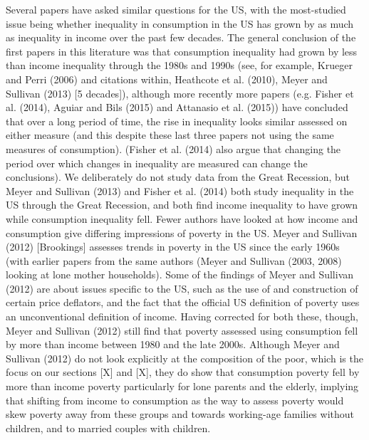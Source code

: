 Several papers have asked similar questions for the US, with the most-studied issue being whether inequality in consumption in the US has grown by as much as inequality in income over the past few decades. The general conclusion of the first papers in this literature was that consumption inequality had grown by less than income inequality through the 1980s and 1990s (see, for example, Krueger and Perri (2006) and citations within, Heathcote et al. (2010), Meyer and Sullivan (2013) [5 decades]), although more recently more papers (e.g. Fisher et al. (2014), Aguiar and Bils (2015) and Attanasio et al. (2015)) have concluded that over a long period of time, the rise in inequality looks similar assessed on either measure (and this despite these last three papers not using the same measures of consumption). (Fisher et al. (2014) also argue that changing the period over which changes in inequality are measured can change the conclusions). We deliberately do not study data from the Great Recession, but Meyer and Sullivan (2013) and Fisher et al. (2014) both study inequality in the US through the Great Recession, and both find income inequality to have grown while consumption inequality fell. Fewer authors have looked at how income and consumption give differing impressions of poverty in the US. Meyer and Sullivan (2012) [Brookings] assesses trends in poverty in the US since the early 1960s (with earlier papers from the same authors (Meyer and Sullivan (2003, 2008) looking at lone mother households). Some of the findings of Meyer and Sullivan (2012) are about issues specific to the US, such as the use of and construction of certain price deflators, and the fact that the official US definition of poverty uses an unconventional definition of income. Having corrected for both these, though, Meyer and Sullivan (2012) still find that poverty assessed using consumption fell by more than income between 1980 and the late 2000s. Although Meyer and Sullivan (2012) do not look explicitly at the composition of the poor, which is the focus on our sections [X] and [X], they do show that consumption poverty fell by more than income poverty particularly for lone parents and the elderly, implying that shifting from income to consumption as the way to assess poverty would skew poverty away from these groups and towards working-age families without children, and to married couples with children.

